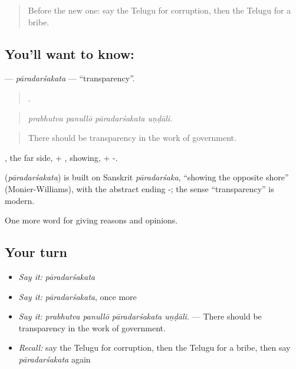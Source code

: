 \label{lesson:TE-C406-paradarsakata}



\begin{quote}
Before the new one: say the Telugu for corruption, then the Telugu for a bribe.
\end{quote}

\subsection*{You'll want to know: }
\textbf{} — \emph{pāradarśakata} — \textquotedblleft{}transparency\textquotedblright{}.

\begin{quote}
   .
\end{quote}

\begin{quote}
\emph{prabhutva panullō pāradarśakata uṇḍāli.}
\end{quote}

\begin{quote}
There should be transparency in the work of government.
\end{quote}

, the far side, + , showing, + -.

\begin{cousinweb}
\textbf{} (\emph{pāradarśakata}) is built on Sanskrit \emph{pāradarśaka}, \textquotedblleft{}showing the opposite shore\textquotedblright{} (Monier-Williams), with the abstract ending -; the sense \textquotedblleft{}transparency\textquotedblright{} is modern.
\end{cousinweb}

\begin{grammarlens}[title={What you've built}]
One more word for giving reasons and opinions.
\end{grammarlens}

\subsection*{Your turn}
\begin{itemize}
\raggedright
  \item \emph{Say it:} \emph{pāradarśakata}
  \item \emph{Say it:} \emph{pāradarśakata}, once more
  \item \emph{Say it:} \emph{prabhutva panullō pāradarśakata uṇḍāli.} — There should be transparency in the work of government.
  \item \emph{Recall:} say the Telugu for corruption, then the Telugu for a bribe, then say \emph{pāradarśakata} again
\end{itemize}

